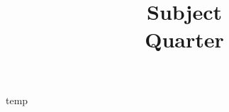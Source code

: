 \documentclass[12pt]{article}
\title{Subject \\
    \large Quarter
}
\author{}
\date{}
\theoremstyle{definition}
\newcommand{\<}{\left\langle}
\renewcommand{\>}{\right\rangle}
\begin{document}
\maketitle

temp
\end{document}

